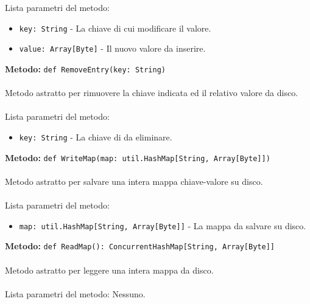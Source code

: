 \documentclass[a4paper]{article}
\begin{document}
		Lista parametri del metodo:
		\begin{itemize}
			\item \texttt{key: String} - La chiave di cui modificare il valore.
			\item \texttt{value: Array[Byte]} - Il nuovo valore da inserire.
		\end{itemize}
		\textbf{Metodo:} \texttt{def RemoveEntry(key: String)}
		\\ \\
		Metodo astratto per rimuovere la chiave indicata ed il relativo valore da disco.
		\\ \\
		Lista parametri del metodo:
		\begin{itemize}
			\item \texttt{key: String} - La chiave di da eliminare.
		\end{itemize}
		\textbf{Metodo:} \texttt{def WriteMap(map: util.HashMap[String, Array[Byte]])}
		\\ \\
		Metodo astratto per salvare una intera mappa chiave-valore su disco.
		\\ \\
		Lista parametri del metodo:
		\begin{itemize}
			\item \texttt{map: util.HashMap[String, Array[Byte]]} - La mappa da salvare su disco.
		\end{itemize}
		\textbf{Metodo:} \texttt{def ReadMap():  ConcurrentHashMap[String, Array[Byte]]}
		\\ \\
		Metodo astratto per leggere una intera mappa da disco.
		\\ \\
		Lista parametri del metodo: Nessuno.	
		
		
			
\end{document}
